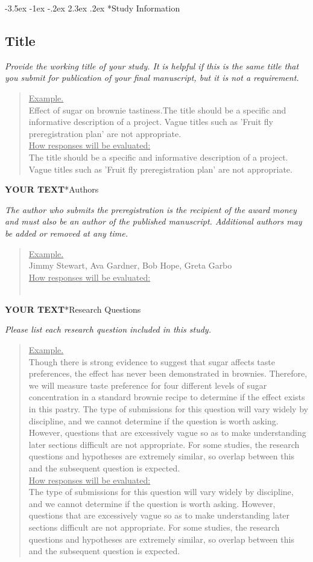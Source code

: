 \documentclass{article}
\makeatletter
\newcommand{\example}[2]{\vspace{-0.3cm}\begin{quote}\underline{Example.}\\#1\ifx#2\undefined \else \\[0.2cm]\underline{How responses will be evaluated:}\\#2\fi\\\end{quote}}
\newcommand{\yourtext}[1]{\noindent\textbf{\color{red}YOUR TEXT}}
\renewcommand{\section}{\@startsection {section}{1}{\z@}%
	{-3.5ex \@plus -1ex \@minus -.2ex}%
	{2.3ex \@plus .2ex}%
	{\normalfont\LARGE\bfseries}}
\makeatother
\begin{document}
	
\section*{Study Information}
	
	\subsection*{Title}
	
	\ifx\hidehints\undefined
	
	\textit{%
	Provide the working title of your study. It is helpful if this is the same title that you submit for publication of your final manuscript, but it is not a requirement.
		}\\
	
	\example{
	Effect of sugar on brownie tastiness.}{The title should be a specific and informative description of a project. Vague titles such as 'Fruit fly preregistration plan' are not appropriate.
	}
	\fi
	
	\yourtext
	
	\subsection*{Authors}
	
	\ifx\hidehints\undefined
	
	\textit{%
	The author who submits the preregistration is the recipient of the award money and must also be an author of the published manuscript. Additional authors may be added or removed at any time.
		}\\
	
	\example{
		Jimmy Stewart, Ava Gardner, Bob Hope, Greta Garbo
	}{}
	\fi
	
	\yourtext
	
	\subsection*{Research Questions}
	
	\ifx\hidehints\undefined
	
	\textit{%
		Please list each research question included in this study.
	}\\
	
	\example{
		Though there is strong evidence to suggest that sugar affects taste preferences, the effect has never been demonstrated in brownies. Therefore, we will measure taste preference for four different levels of sugar concentration in a standard brownie recipe to determine if the effect exists in this pastry.}{		
		The type of submissions for this question will vary widely by discipline, and we cannot determine if the question is worth asking. However, questions that are excessively vague so as to make understanding later sections difficult are not appropriate. For some studies, the research questions and hypotheses are extremely similar, so overlap between this and the subsequent question is expected.
	}
	\fi
	
\end{document}
